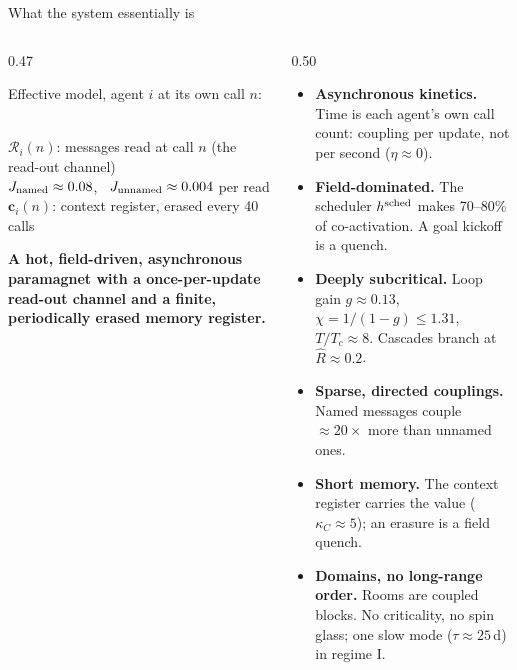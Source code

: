 \begin{frame}{What the system essentially is}
\begin{columns}[T,onlytextwidth]
\begin{column}{0.47\textwidth}
\colorbox{panel}{\parbox{\dimexpr\linewidth-2\fboxsep}{\small\vspace{0.3em}
\centering Effective model, agent $i$ at its own call $n$:\\[0.5em]
\\[0.6em]
\raggedright\footnotesize
$\mathcal R_i(n)$: messages read at call $n$ (the read-out channel)\\
$J_{\rm named}\approx0.08$, \ $J_{\rm unnamed}\approx0.004$ per read\\
$\mathbf c_i(n)$: context register, erased every 40 calls\\[0.3em]}}\par\vspace{0.8em}
{\small\bfseries A hot, field-driven, asynchronous paramagnet with a once-per-update read-out channel and a finite, periodically erased memory register.}
\end{column}
\begin{column}{0.50\textwidth}
\footnotesize
\begin{itemize}\setlength{\itemsep}{0.35em}
\item \textbf{Asynchronous kinetics.} Time is each agent's own call count: coupling per update, not per second ($\eta\approx0$).
\item \textbf{Field-dominated.} The scheduler $h^{\rm sched}$ makes 70--80\% of co-activation. A goal kickoff is a quench.
\item \textbf{Deeply subcritical.} Loop gain $g\approx0.13$, $\chi=1/(1-g)\le1.31$, $T/T_c\approx8$. Cascades branch at $\hat R\approx0.2$.
\item \textbf{Sparse, directed couplings.} Named messages couple $\approx20\times$ more than unnamed ones.
\item \textbf{Short memory.} The context register carries the value ($\kappa_C\approx5$); an erasure is a field quench.
\item \textbf{Domains, no long-range order.} Rooms are coupled blocks. No criticality, no spin glass; one slow mode ($\tau\approx25$\,d) in regime I.
\end{itemize}
\end{column}
\end{columns}
\end{frame}

